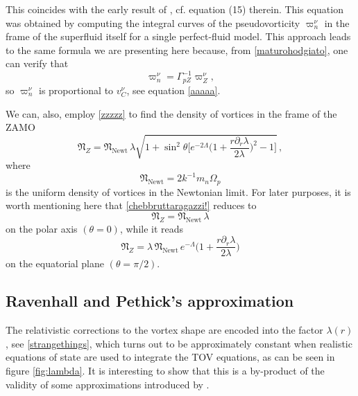 \documentclass[usenatbib%
]{mnras}
\begin{document}
This coincides with the early result of \cite{Rothen1981}, cf. equation (15) therein. This equation was obtained by \cite{Rothen1981} computing the integral curves of the pseudovorticity $\varpi_n^\nu$ in the frame of the superfluid itself for a single perfect-fluid model. This approach leads to the same formula we are presenting here because, from \eqref{maturohodgiato}, one can verify that  
\begin{equation}
\varpi_n^\nu=\Gamma_{pZ}^{-1}\varpi_Z^\nu,
\end{equation}
so $\varpi_n^\nu$ is proportional to $v_C^\nu$, see equation \eqref{aaaaa}.

We can, also, employ \eqref{zzzzz} to find the density of vortices in the frame of the ZAMO
\begin{equation}\label{chebbruttaragazzi!}
\mathfrak{N}_Z 
= 
\mathfrak{N}_{\textrm{Newt}} \, \lambda \sqrt{1+\sin^2 \theta 
\bigg[ e^{-2\Lambda} \bigg( 1 + \dfrac{r \partial_r \lambda}{2 \lambda}\bigg)^2 -1 \bigg]} \, ,
\end{equation}
where
\begin{equation}
\mathfrak{N}_{\textrm{Newt}} = 2 k^{-1} m_n \Omega_p 
\end{equation}
is the uniform density of vortices in the Newtonian limit.
For later purposes, it is worth mentioning here that \eqref{chebbruttaragazzi!}  reduces to 
\begin{equation}
\mathfrak{N}_Z = \mathfrak{N}_{\textrm{Newt}} \,   \lambda   
\end{equation}
on the polar axis $(\theta = 0)$, while  it reads
\begin{equation}\label{capitanfinduseilmare}
\mathfrak{N}_Z = \lambda \, \mathfrak{N}_{\textrm{Newt}}  \, e^{-\Lambda} \bigg( 1 + \dfrac{r \partial_r \lambda}{2 \lambda} \bigg) 
\end{equation}
on the equatorial plane $(\theta = \pi/2)$.


\subsection{Ravenhall and Pethick's approximation}\label{numericalresults}

The relativistic corrections to the vortex shape are encoded into the factor  $\lambda(r)$, see \eqref{strangethings}, which turns out to be approximately constant when realistic equations of state are used to integrate the TOV equations, as can be seen in figure \ref{fig:lambda}. 
It is interesting to show that this is a by-product of the validity of some approximations introduced by \cite{Ravenhall_Pethick1994}. 
\end{document}
